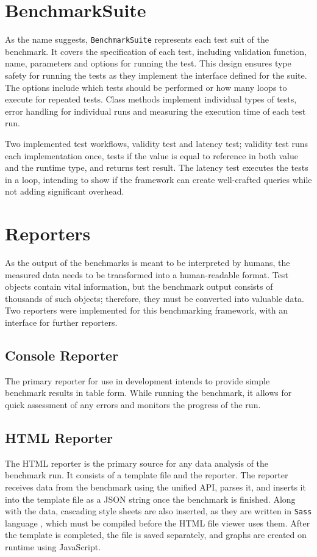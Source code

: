 \section{BenchmarkSuite}

As the name suggests, \texttt{BenchmarkSuite} represents each test suit of the
benchmark. It covers the specification of each test, including validation
function, name, parameters and options for running the test. This design ensures
type safety for running the tests as they implement the interface defined for
the suite. The options include which tests should be performed or how many loops
to execute for repeated tests. Class methods implement individual types of
tests, error handling for individual runs and measuring the execution time of
each test run.

Two implemented test workflows, validity test and latency test; validity test
runs each implementation once, tests if the value is equal to reference in both
value and the runtime type, and returns test result. The latency test executes
the tests in a loop, intending to show if the framework can create well-crafted
queries while not adding significant overhead.

\section{Reporters}
As the output of the benchmarks is meant to be interpreted by humans, the
measured data needs to be transformed into a human-readable format. Test objects
contain vital information, but the benchmark output consists of thousands of
such objects; therefore, they must be converted into valuable data. Two
reporters were implemented for this benchmarking framework, with an interface
for further reporters.

\subsection*{Console Reporter}
The primary reporter for use in development intends to provide simple benchmark
results in table form. While running the benchmark, it allows for quick
assessment of any errors and monitors the progress of the run.

\subsection*{HTML Reporter}
The HTML reporter is the primary source for any data analysis of the benchmark
run. It consists of a template file and the reporter. The reporter receives data
from the benchmark using the unified API, parses it, and inserts it into the
template file as a JSON string once the benchmark is finished. Along with the
data, cascading style sheets are also inserted, as they are written in
\texttt{Sass} language \cite{Sass}, which must be compiled before the HTML file
viewer uses them. After the template is completed, the file is saved separately,
and graphs are created on runtime using JavaScript.

